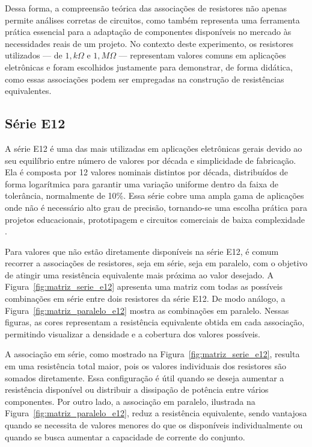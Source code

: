 \documentclass[conference]{IEEEtran}
\begin{document}
Dessa forma, a compreensão teórica das associações de resistores não apenas permite análises corretas de circuitos, como também representa uma ferramenta prática essencial para a adaptação de componentes disponíveis no mercado às necessidades reais de um projeto. No contexto deste experimento, os resistores utilizados — de $1,k\Omega$ e $1,M\Omega$ — representam valores comuns em aplicações eletrônicas e foram escolhidos justamente para demonstrar, de forma didática, como essas associações podem ser empregadas na construção de resistências equivalentes.

\subsection{Série E12}

A série E12 é uma das mais utilizadas em aplicações eletrônicas gerais devido ao seu equilíbrio entre número de valores por década e simplicidade de fabricação. Ela é composta por 12 valores nominais distintos por década, distribuídos de forma logarítmica para garantir uma variação uniforme dentro da faixa de tolerância, normalmente de 10\%. Essa série cobre uma ampla gama de aplicações onde não é necessário alto grau de precisão, tornando-se uma escolha prática para projetos educacionais, prototipagem e circuitos comerciais de baixa complexidade \cite{iec60063}.

Para valores que não estão diretamente disponíveis na série E12, é comum recorrer a associações de resistores, seja em série, seja em paralelo, com o objetivo de atingir uma resistência equivalente mais próxima ao valor desejado. A Figura~\ref{fig:matriz_serie_e12} apresenta uma matriz com todas as possíveis combinações em série entre dois resistores da série E12. De modo análogo, a Figura~\ref{fig:matriz_paralelo_e12} mostra as combinações em paralelo. Nessas figuras, as cores representam a resistência equivalente obtida em cada associação, permitindo visualizar a densidade e a cobertura dos valores possíveis.

A associação em série, como mostrado na Figura~\ref{fig:matriz_serie_e12}, resulta em uma resistência total maior, pois os valores individuais dos resistores são somados diretamente. Essa configuração é útil quando se deseja aumentar a resistência disponível ou distribuir a dissipação de potência entre vários componentes. Por outro lado, a associação em paralelo, ilustrada na Figura~\ref{fig:matriz_paralelo_e12}, reduz a resistência equivalente, sendo vantajosa quando se necessita de valores menores do que os disponíveis individualmente ou quando se busca aumentar a capacidade de corrente do conjunto.
\end{document}
